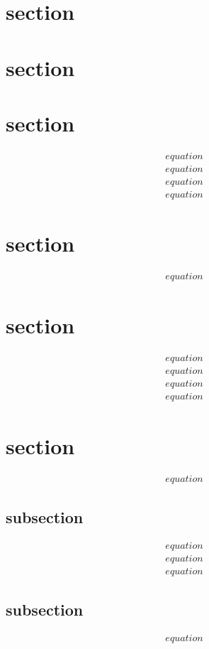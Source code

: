\documentclass[12pt]{article}
\begin{document}
 

\rhead{\today}
 
\section{section}
\section{section}
\section{section}
\begin{align*}
    equation
\end{align*}
\begin{align*}
    equation
\end{align*}
\begin{align*}
   equation 
\end{align*} 
\begin{align*}
   equation
\end{align*}
\section{section}
\begin{align*}
    equation
\end{align*}
\section{section}
\begin{align*}
    equation
\end{align*}
\begin{align*}
    equation
\end{align*}
\begin{align*}
    equation
\end{align*}
\begin{align*}
    equation
\end{align*}
\section{section}
\begin{align*}
    equation
\end{align*}
\subsection{subsection}
\begin{align*}
    equation
\end{align*}
\begin{align*}
    equation
\end{align*}
\begin{align*}
    equation
\end{align*}
\subsection{subsection}
\begin{align*}
    equation
\end{align*}
\end{document}
